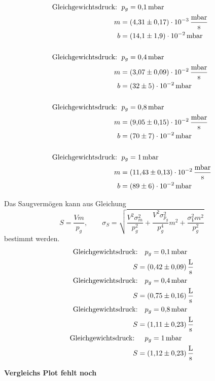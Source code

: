 \begin{align*}
  \text{Gleichgewichtsdruck: } &\, p_g=\SI{0.1}{\milli\bar} \\
  m&= \SI{4.31\pm 0.17 e-3 }{\milli\bar\per\second}\\
  b&=\SI{14.1\pm1.9 e-2}{\milli\bar}\\
  \\
  \text{Gleichgewichtsdruck: } &\, p_g=\SI{0.4}{\milli\bar} \\
  m&= \SI{3.07\pm 0.09 e-2 }{\milli\bar\per\second}\\
  b&=\SI{32\pm5 e-2}{\milli\bar}\\
  \\
  \text{Gleichgewichtsdruck: } &\, p_g=\SI{0.8}{\milli\bar}\\
  m&= \SI{9.05\pm 0.15 e-2 }{\milli\bar\per\second}\\
  b&=\SI{70\pm7 e-2}{\milli\bar}\\
  \\
  \text{Gleichgewichtsdruck: } &\, p_g=\SI{1}{\milli\bar}\\
  m&= \SI{11.43\pm 0.13 e-2 }{\milli\bar\per\second}\\
  b&=\SI{89\pm 6 e-2}{\milli\bar}
\end{align*}

Das Saugvermögen kann aus Gleichung
\begin{equation}
  \label{eq:saug_leck}
  S=\frac{Vm}{p_g}, \qquad \sigma_{S}=\sqrt{\frac{V^{2} \sigma_{m}^{2}}{p_{g}^{2}} + \frac{V^{2} \sigma_{p_{g}}^{2}}{p_{g}^{4}} m^{2} + \frac{\sigma_{V}^{2} m^{2}}{p_{g}^{2}}}
\end{equation}
bestimmt werden.
\begin{align*}
  \text{Gleichgewichtsdruck:} &\quad p_g=\SI{0.1}{\milli\bar} \\
  S&=\SI{0.42\pm 0.09}{\litre\per\second}
  \\
  \text{Gleichgewichtsdruck:} &\quad p_g=\SI{0.4}{\milli\bar} \\
  S&=\SI{0.75\pm 0.16}{\litre\per\second}
  \\
  \text{Gleichgewichtsdruck:} &\quad p_g=\SI{0.8}{\milli\bar}\\
  S&=\SI{1.11\pm 0.23}{\litre\per\second}
  \\
  \text{Gleichgewichtsdruck: } &\quad p_g=\SI{1}{\milli\bar}\\
  S&=\SI{1.12\pm 0.23}{\litre\per\second}
\end{align*}

\textbf{Vergleichs Plot fehlt noch}

